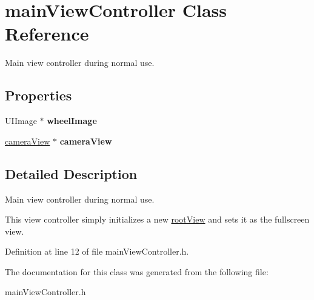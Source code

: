 \hypertarget{interfacemain_view_controller}{
\section{mainViewController Class Reference}
\label{interfacemain_view_controller}
}


Main view controller during normal use.  


\subsection*{Properties}
\begin{DoxyCompactItemize}
\item 
\hypertarget{interfacemain_view_controller_ae33e0c42353d02d0541c6c9de0b27701}{
UIImage $\ast$ {\bfseries wheelImage}}
\label{interfacemain_view_controller_ae33e0c42353d02d0541c6c9de0b27701}

\item 
\hypertarget{interfacemain_view_controller_a034d4e0dca0d818871273e839270c1ac}{
\hyperlink{interfacecamera_view}{cameraView} $\ast$ {\bfseries cameraView}}
\label{interfacemain_view_controller_a034d4e0dca0d818871273e839270c1ac}

\end{DoxyCompactItemize}


\subsection{Detailed Description}
Main view controller during normal use. 

This view controller simply initializes a new \hyperlink{interfaceroot_view}{rootView} and sets it as the fullscreen view. 

Definition at line 12 of file mainViewController.h.



The documentation for this class was generated from the following file:\begin{DoxyCompactItemize}
\item 
mainViewController.h\end{DoxyCompactItemize}
